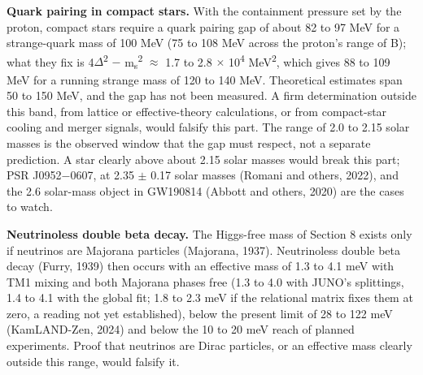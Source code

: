 \documentclass[
  11pt,
]{article}
\begin{document}
\textbf{Quark pairing in compact stars.} With the containment pressure set by the proton, compact stars require a quark pairing gap of about 82 to 97 MeV for a strange-quark mass of 100 MeV (75 to 108 MeV across the proton's range of B); what they fix is 4\ensuremath{\Delta}\textsuperscript{2} \ensuremath{-} m\textsubscript{s}\textsuperscript{2} \ensuremath{\approx} 1.7 to 2.8 \ensuremath{\times} 10\textsuperscript{4} MeV\textsuperscript{2}, which gives 88 to 109 MeV for a running strange mass of 120 to 140 MeV. Theoretical estimates span 50 to 150 MeV, and the gap has not been measured. A firm determination outside this band, from lattice or effective-theory calculations, or from compact-star cooling and merger signals, would falsify this part. The range of 2.0 to 2.15 solar masses is the observed window that the gap must respect, not a separate prediction. A star clearly above about 2.15 solar masses would break this part; PSR J0952\ensuremath{-}0607, at 2.35 \ensuremath{\pm} 0.17 solar masses (Romani and others, 2022), and the 2.6 solar-mass object in GW190814 (Abbott and others, 2020) are the cases to watch.

\textbf{Neutrinoless double beta decay.} The Higgs-free mass of Section 8 exists only if neutrinos are Majorana particles (Majorana, 1937). Neutrinoless double beta decay (Furry, 1939) then occurs with an effective mass of 1.3 to 4.1 meV with TM1 mixing and both Majorana phases free (1.3 to 4.0 with JUNO's splittings, 1.4 to 4.1 with the global fit; 1.8 to 2.3 meV if the relational matrix fixes them at zero, a reading not yet established), below the present limit of 28 to 122 meV (KamLAND-Zen, 2024) and below the 10 to 20 meV reach of planned experiments. Proof that neutrinos are Dirac particles, or an effective mass clearly outside this range, would falsify it.
\end{document}
